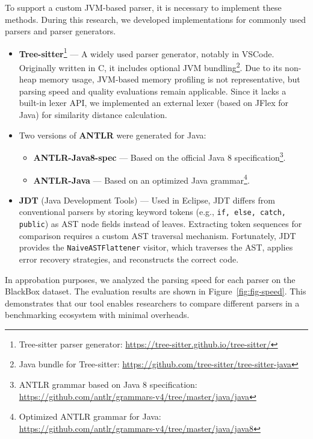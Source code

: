 \documentclass[conference]{IEEEtran}
\begin{document}
To support a custom JVM-based parser, it is necessary to implement these methods. During this research, we developed implementations for commonly used parsers and parser generators.

\begin{itemize}
    \item \textbf{Tree-sitter}\footnote{Tree-sitter parser generator: \url{https://tree-sitter.github.io/tree-sitter/}} --- A widely used parser generator, notably in VSCode. Originally written in C, it includes optional JVM bundling\footnote{Java bundle for Tree-sitter: \url{https://github.com/tree-sitter/tree-sitter-java}}.  Due to its non-heap memory usage, JVM-based memory profiling is not representative, but parsing speed and quality evaluations remain applicable. Since it lacks a built-in lexer API, we implemented an external lexer (based on JFlex for Java) for similarity distance calculation.

    \item Two versions of \textbf{ANTLR}\cite{all-star} were generated for Java:
    \begin{itemize}
        \item \textbf{ANTLR-Java8-spec} --- Based on the official Java 8 specification\footnote{ANTLR grammar based on Java 8 specification:\\ \url{https://github.com/antlr/grammars-v4/tree/master/java/java}}.
        \item \textbf{ANTLR-Java} --- Based on an optimized Java grammar\footnote{Optimized ANTLR grammar for Java:\\ \url{https://github.com/antlr/grammars-v4/tree/master/java/java8}}.
    \end{itemize}  
 

    \item \textbf{JDT} (Java Development Tools) --- Used in Eclipse, JDT differs from conventional parsers by storing keyword tokens (e.g., \texttt{if, else, catch, public}) as AST node fields instead of leaves. Extracting token sequences for comparison requires a custom AST traversal mechanism. Fortunately, JDT provides the \texttt{NaiveASTFlattener} visitor, which traverses the AST, applies error recovery strategies, and reconstructs the correct code.
\end{itemize}


In approbation purposes, we analyzed the parsing speed for each parser on the BlackBox dataset. The evaluation results are shown in Figure~\ref{fig:fig-speed}. This demonstrates that our tool enables researchers to compare different parsers in a benchmarking ecosystem with minimal overheads.
\end{document}
